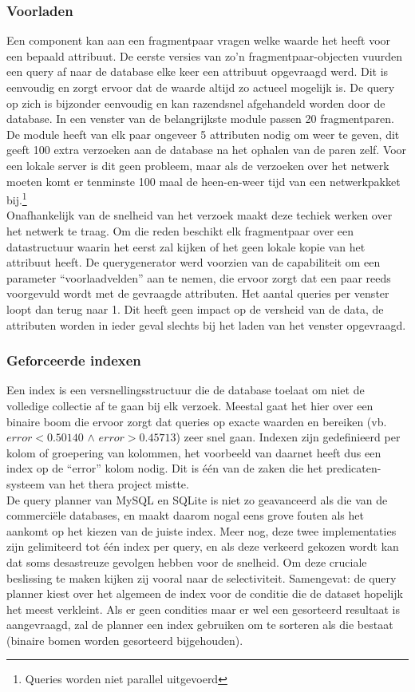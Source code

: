 \subsubsection{Voorladen}
Een component kan aan een fragmentpaar vragen welke waarde het heeft voor een bepaald attribuut. De eerste versies van zo'n fragmentpaar-objecten vuurden een query af naar de database elke keer een attribuut opgevraagd werd. Dit is eenvoudig en zorgt ervoor dat de waarde altijd zo actueel mogelijk is. De query op zich is bijzonder eenvoudig en kan razendsnel afgehandeld worden door de database. In een venster van de belangrijkste module passen 20 fragmentparen. De module heeft van elk paar ongeveer 5 attributen nodig om weer te geven, dit geeft 100 extra verzoeken aan de database na het ophalen van de paren zelf. Voor een lokale server is dit geen probleem, maar als de verzoeken over het netwerk moeten komt er tenminste 100 maal de heen-en-weer tijd van een netwerkpakket bij.\footnote{Queries worden niet parallel uitgevoerd}\\

Onafhankelijk van de snelheid van het verzoek maakt deze techiek werken over het netwerk te traag. Om die reden beschikt elk fragmentpaar over een datastructuur waarin het eerst zal kijken of het geen lokale kopie van het attribuut heeft. De querygenerator werd voorzien van de capabiliteit om een parameter ``voorlaadvelden'' aan te nemen, die ervoor zorgt dat een paar reeds voorgevuld wordt met de gevraagde attributen. Het aantal queries per venster loopt dan terug naar 1. Dit heeft geen impact op de versheid van de data, de attributen worden in ieder geval slechts bij het laden van het venster opgevraagd.

\subsubsection{Geforceerde indexen}
Een index is een versnellingsstructuur die de database toelaat om niet de volledige collectie af te gaan bij elk verzoek. Meestal gaat het hier over een binaire boom die ervoor zorgt dat queries op exacte waarden en bereiken (vb. $error < 0.50140$ $\land$ $error > 0.45713$) zeer snel gaan. Indexen zijn gedefinieerd per kolom of groepering van kolommen, het voorbeeld van daarnet heeft dus een index op de ``error'' kolom nodig. Dit is \'e\'en van de zaken die het predicaten-systeem van het thera project mistte.\\

De query planner van MySQL en SQLite is niet zo geavanceerd als die van de commerci\"ele databases, en maakt daarom nogal eens grove fouten als het aankomt op het kiezen van de juiste index. Meer nog, deze twee implementaties zijn gelimiteerd tot \'e\'en index per query, en als deze verkeerd gekozen wordt kan dat soms desastreuze gevolgen hebben voor de snelheid. Om deze cruciale beslissing te maken kijken zij vooral naar de selectiviteit. Samengevat: de query planner kiest over het algemeen de index voor de conditie die de dataset hopelijk het meest verkleint. Als er geen condities maar er wel een gesorteerd resultaat is aangevraagd, zal de planner een index gebruiken om te sorteren als die bestaat (binaire bomen worden gesorteerd bijgehouden).\\

